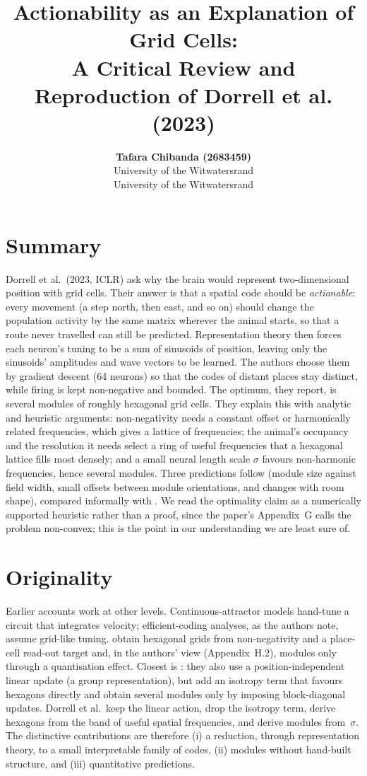 \documentclass[10pt,letterpaper]{article}
\title{Actionability as an Explanation of Grid Cells:\\A Critical Review and Reproduction of Dorrell et al. (2023)}
\author{{\large\bf Tafara Chibanda (2683459)}\\University of the Witwatersrand
\And {\large\bf Nathan Le Roux (2717495)}\\University of the Witwatersrand}
\begin{document}
\maketitle

\section{Summary}
Dorrell et al.\ (2023, ICLR) ask why the brain would represent two-dimensional position with grid cells. Their answer is that a spatial code should be \emph{actionable}: every movement (a step north, then east, and so on) should change the population activity by the same matrix wherever the animal starts, so that a route never travelled can still be predicted. Representation theory then forces each neuron's tuning to be a sum of sinusoids of position, leaving only the sinusoids' amplitudes and wave vectors to be learned. The authors choose them by gradient descent (64 neurons) so that the codes of distant places stay distinct, while firing is kept non-negative and bounded. The optimum, they report, is several modules of roughly hexagonal grid cells. They explain this with analytic and heuristic arguments: non-negativity needs a constant offset or harmonically related frequencies, which gives a lattice of frequencies; the animal's occupancy and the resolution it needs select a ring of useful frequencies that a hexagonal lattice fills most densely; and a small neural length scale $\sigma$ favours non-harmonic frequencies, hence several modules. Three predictions follow (module size against field width, small offsets between module orientations, and changes with room shape), compared informally with \citet{stensola2012}. We read the optimality claim as a numerically supported heuristic rather than a proof, since the paper's Appendix~G calls the problem non-convex; this is the point in our understanding we are least sure of.

\section{Originality}
Earlier accounts work at other levels. Continuous-attractor models \citep{burak2009} hand-tune a circuit that integrates velocity; efficient-coding analyses, as the authors note, assume grid-like tuning. \citet{sorscher2019} obtain hexagonal grids from non-negativity and a place-cell read-out target and, in the authors' view (Appendix~H.2), modules only through a quantisation effect. Closest is \citet{gao2021}: they also use a position-independent linear update (a group representation), but add an isotropy term that favours hexagons directly and obtain several modules only by imposing block-diagonal updates. Dorrell et al.\ keep the linear action, drop the isotropy term, derive hexagons from the band of useful spatial frequencies, and derive modules from~$\sigma$. The distinctive contributions are therefore (i) a reduction, through representation theory, to a small interpretable family of codes, (ii) modules without hand-built structure, and (iii) quantitative predictions.
\end{document}
